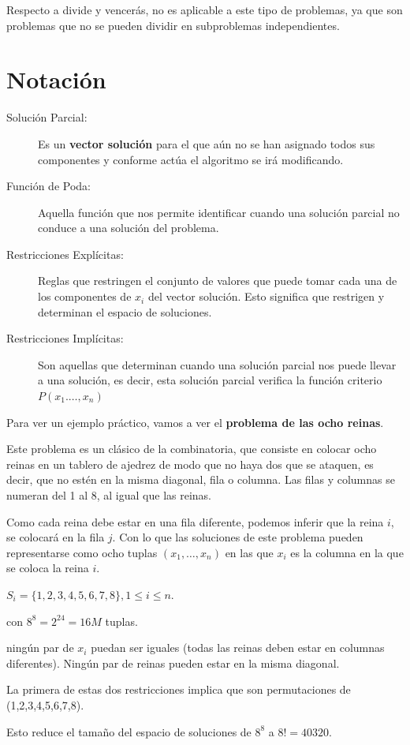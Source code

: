 \documentclass[10pt,a4paper,spanish]{report}
\theoremstyle{definition}
\theoremstyle{remark}
\begin{document}
Respecto a divide y vencerás, no es aplicable a este tipo de problemas, ya que son problemas que no se pueden dividir en subproblemas independientes.


\section{\textcolor{electricgreen}Notación}

\begin{description}
    \item [Solución Parcial:] Es un \textbf{\textcolor{electricgreen}{vector solución}} para el que aún no se han asignado todos sus componentes y conforme actúa el algoritmo se irá modificando.

    \item [Función de Poda:] Aquella función que nos permite identificar cuando una solución parcial no conduce a una solución del problema.

    \item [Restricciones Explícitas:] Reglas que restringen el conjunto de valores que puede tomar cada una de los componentes de $x_i$ del vector solución. Esto significa que restrigen y determinan el espacio de soluciones.

    \item [Restricciones Implícitas:] Son aquellas que determinan cuando una solución parcial nos puede llevar a una solución, es decir, esta solución parcial verifica la función criterio $P(x_1.\ldots,x_n)$
\end{description}

Para ver un ejemplo práctico, vamos a ver el \textbf{\textcolor{electricgreen}{problema de las ocho reinas}}.

Este problema es un clásico de la combinatoria, que consiste en colocar ocho reinas en un tablero de ajedrez de modo que no haya dos que se ataquen, es decir, que no estén en la misma diagonal, fila o columna. Las filas y columnas se numeran del 1 al 8, al igual que las reinas.

Como cada reina debe estar en una fila diferente, podemos inferir que la reina $i$, se colocará en la fila $j$. Con lo que las soluciones de este problema pueden representarse como ocho tuplas $(x_1,\ldots,x_n)$ en las que $x_i$ es la columna en la que se coloca la reina $i$.

\begin{description}
    \item [Restricciones explícitas:] $S_i = \{1,2,3,4,5,6,7,8\}, 1\leq i \leq n$.
    \item [Espacio solución:] con $8^8 = 2^{24} = 16M$ tuplas.
    \item [Restricciones implícitas:] ningún par de $x_i$ puedan ser iguales (todas las reinas deben estar en columnas diferentes). Ningún par de reinas pueden estar en la misma diagonal.
    \item La primera de estas dos restricciones implica que son permutaciones de (1,2,3,4,5,6,7,8).
    \item Esto reduce el tamaño del espacio de soluciones de $8^8$ a $8! = 40320$.
\end{description} 
\end{document}

